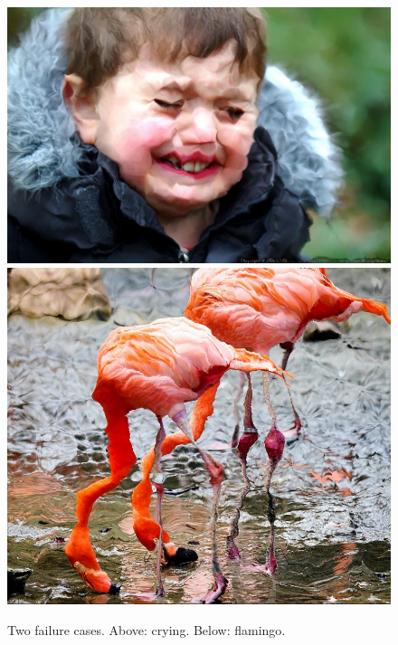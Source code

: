 \begin{figure}[htbp] \centering
\includegraphics[width=5.9in]{images/crying-failure.jpg}
\vspace{1.1mm}
\includegraphics[width=5.9in]{images/flamingo-failure.jpg}
\caption{Two failure cases. Above: crying. Below: flamingo.}
\label{fig:failure}
\end{figure}

